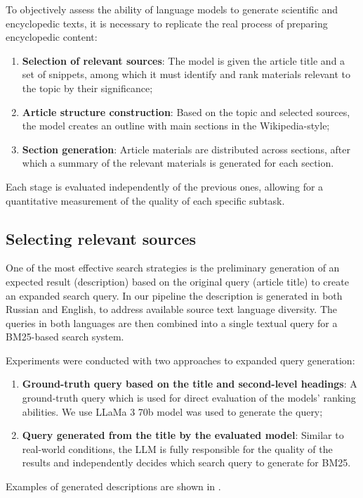 \documentclass{superfri}
\begin{document}
To objectively assess the ability of language models to generate scientific and encyclopedic texts, it is necessary to replicate the real process of preparing encyclopedic content:
\begin{enumerate}
    \item \textbf{Selection of relevant sources}: The model is given the article title and a set of snippets, among which it must identify and rank materials relevant to the topic by their significance;
    \item \textbf{Article structure construction}: Based on the topic and selected sources, the model creates an outline with main sections in the Wikipedia-style;
    \item \textbf{Section generation}: Article materials are distributed across sections, after which a summary of the relevant materials is generated for each section.
\end{enumerate}
Each stage is evaluated independently of the previous ones, allowing for a quantitative measurement of the quality of each specific subtask.

\subsection{Selecting relevant sources}
One of the most effective search strategies \cite{rerank} is the preliminary generation of an expected result (description) based on the original query (article title) to create an expanded search query.
In our pipeline the description is generated in both Russian and English, to address available source text language diversity.
The queries in both languages are then combined into a single textual query for a BM25-based search system.

Experiments were conducted with two approaches to expanded query generation:
\begin{enumerate}
\item \textbf{Ground-truth query based on the title and second-level headings}: A ground-truth query which is used for direct evaluation of the models' ranking abilities.
We use LLaMa 3 70b model \cite{llama} was used to generate the query;
\item \textbf{Query generated from the title by the evaluated model}: Similar to real-world conditions, the LLM is fully responsible for the quality of the results and independently decides which search query to generate for BM25.
\end{enumerate}
Examples of generated descriptions are shown in .
\end{document}

